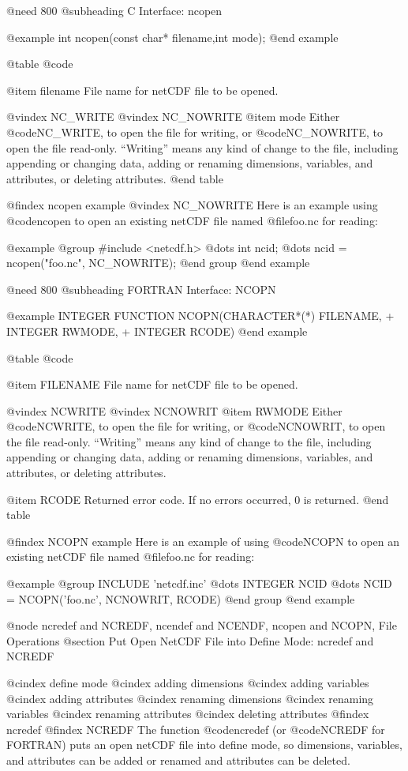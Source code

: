 @need 800
@subheading C Interface:  ncopen

@example
int ncopen(const char* filename,int mode);
@end example

@table @code

@item filename
File name for netCDF file to be opened.

@vindex NC_WRITE
@vindex NC_NOWRITE
@item mode
Either @code{NC_WRITE}, to open the file for writing, or @code{NC_NOWRITE}, to
open the file read-only.  ``Writing'' means any kind of change to the
file, including appending or changing data, adding or renaming dimensions,
variables, and attributes, or deleting attributes.
@end table

@findex ncopen example
@vindex NC_NOWRITE
Here is an example using @code{ncopen} to open an existing netCDF file
named @file{foo.nc} for reading:

@example
@group
#include <netcdf.h>
   @dots{}
int ncid;
   @dots{}
ncid = ncopen("foo.nc", NC_NOWRITE);
@end group
@end example

@need 800
@subheading FORTRAN Interface:  NCOPN

@example
      INTEGER FUNCTION NCOPN(CHARACTER*(*) FILENAME,
     +                       INTEGER RWMODE,
     +                       INTEGER RCODE)
@end example

@table @code

@item FILENAME
File name for netCDF file to be opened.

@vindex NCWRITE
@vindex NCNOWRIT
@item RWMODE
Either @code{NCWRITE}, to open the file for writing, or @code{NCNOWRIT}, to
open the file read-only.  ``Writing'' means any kind of change to the
file, including appending or changing data, adding or renaming dimensions,
variables, and attributes, or deleting attributes.

@item RCODE
Returned error code.  If no errors occurred, 0 is returned.
@end table

@findex NCOPN example
Here is an example of using @code{NCOPN} to open an existing netCDF file
named @file{foo.nc} for reading:

@example
@group
      INCLUDE 'netcdf.inc'
         @dots{}
      INTEGER NCID
         @dots{}
      NCID = NCOPN('foo.nc', NCNOWRIT, RCODE)
@end group
@end example

@node ncredef and NCREDF, ncendef and NCENDF, ncopen and NCOPN, File Operations
@section Put Open NetCDF File into Define Mode:  ncredef and NCREDF

@cindex define mode
@cindex adding dimensions
@cindex adding variables
@cindex adding attributes
@cindex renaming dimensions
@cindex renaming variables
@cindex renaming attributes
@cindex deleting attributes
@findex ncredef
@findex NCREDF
The function @code{ncredef} (or @code{NCREDF} for FORTRAN)
puts an open netCDF file into define mode, so dimensions, variables,
and attributes can be added or renamed and attributes can be deleted.

